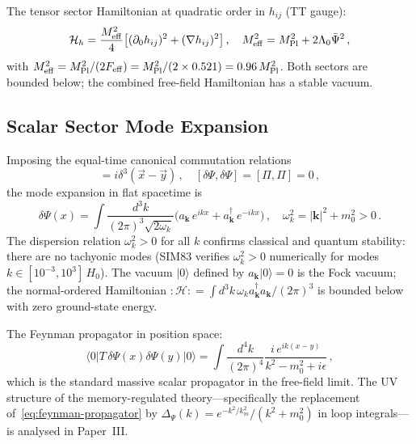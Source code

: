 \documentclass[12pt,a4paper]{article}
\newcommand{\Psibar}{\bar\Psi}
\newcommand{\Feff}{F_{\rm eff}}
\newcommand{\Lz}{\Lambda_0}
\begin{document}
The tensor sector Hamiltonian at quadratic order in $h_{ij}$ (TT gauge):
\begin{equation}
  \mathcal{H}_{h} = \frac{M_{\rm eff}^2}{4}\bigl[
    (\partial_0 h_{ij})^2 + (\nabla h_{ij})^2
  \bigr]\,,
  \quad M_{\rm eff}^2 = M_{\rm Pl}^2 + 2\Lz\Psibar^2\,,
\end{equation}
with $M_{\rm eff}^2 = M_{\rm Pl}^2/(2\Feff) = M_{\rm Pl}^2/(2\times0.521)
= 0.96\,M_{\rm Pl}^2$. Both sectors are bounded below; the combined
free-field Hamiltonian has a stable vacuum.

\subsection{Scalar Sector Mode Expansion}
\label{sec:scalar-modes}

Imposing the equal-time canonical commutation relations
\begin{equation}
  [\delta\Psi(\vec x, t), \Pi(\vec y, t)] = i\delta^3(\vec x - \vec y)\,,
  \quad
  [\delta\Psi, \delta\Psi] = [\Pi, \Pi] = 0\,,
  \label{eq:ccr}
\end{equation}
the mode expansion in flat spacetime is
\begin{equation}
  \delta\Psi(x) = \int\!\frac{d^3k}{(2\pi)^3\sqrt{2\omega_k}}
  \bigl(a_{\mathbf k}\,e^{ikx} + a^\dagger_{\mathbf k}\,e^{-ikx}\bigr)\,,
  \quad \omega_k^2 = |\mathbf k|^2 + m_0^2 > 0\,.
  \label{eq:mode-expansion}
\end{equation}
The dispersion relation $\omega_k^2 > 0$ for all $k$ confirms classical and
quantum stability: there are no tachyonic modes (SIM83 verifies
$\omega_k^2 > 0$ numerically for modes $k \in [10^{-3}, 10^3]\,H_0$).
The vacuum $|0\rangle$ defined by $a_{\mathbf k}|0\rangle = 0$ is the Fock
vacuum; the normal-ordered Hamiltonian $:\mathcal{H}: = \int d^3k\,\omega_k
a^\dagger_{\mathbf k}a_{\mathbf k}/(2\pi)^3$ is bounded below with zero
ground-state energy.

The Feynman propagator in position space:
\begin{equation}
  \langle 0|T\,\delta\Psi(x)\delta\Psi(y)|0\rangle
  = \int\!\frac{d^4k}{(2\pi)^4}\frac{i\,e^{ik(x-y)}}{k^2 - m_0^2 + i\epsilon}\,,
  \label{eq:feynman-propagator}
\end{equation}
which is the standard massive scalar propagator in the free-field limit.
The UV structure of the memory-regulated theory---specifically the
replacement of~\eqref{eq:feynman-propagator} by $\Delta_\Psi(k) =
e^{-k^2/k_m^2}/(k^2 + m_0^2)$ in loop integrals---is analysed in
Paper~III.
\end{document}
